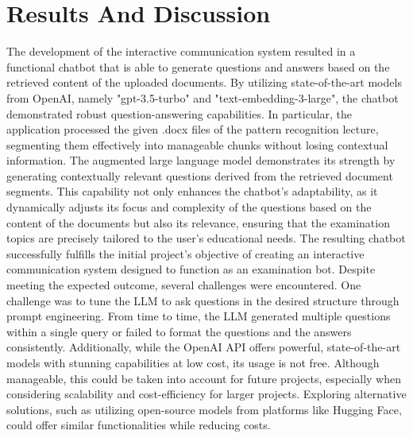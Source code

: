 \documentclass{article}
\begin{document}
\section{Results And Discussion}
The development of the interactive communication system resulted in a functional chatbot that is able to generate questions and answers based on the retrieved content of the uploaded documents. By utilizing state-of-the-art models from OpenAI, namely "gpt-3.5-turbo" and "text-embedding-3-large", the chatbot demonstrated robust question-answering capabilities. In particular, the application processed the given .docx files of the pattern recognition lecture, segmenting them effectively into manageable chunks without losing contextual information.
\newline
The augmented large language model demonstrates its strength by generating contextually relevant questions derived from the retrieved document segments. This capability not only enhances the chatbot's adaptability, as it dynamically adjusts its focus and complexity of the questions based on the content of the documents but also its relevance, ensuring that the examination topics are precisely tailored to the user's educational needs.
\newline
The resulting chatbot successfully fulfills the initial project's objective of creating an interactive communication system designed to function as an examination bot. Despite meeting the expected outcome, several challenges were encountered. One challenge was to tune the LLM to ask questions in the desired structure through prompt engineering. From time to time, the LLM generated multiple questions within a single query or failed to format the questions and the answers consistently. Additionally, while the OpenAI API offers powerful, state-of-the-art models with stunning capabilities at low cost, its usage is not free. Although manageable, this could be taken into account for future projects, especially when considering scalability and cost-efficiency for larger projects. Exploring alternative solutions, such as utilizing open-source models from platforms like Hugging Face, could offer similar functionalities while reducing costs.
\end{document}
